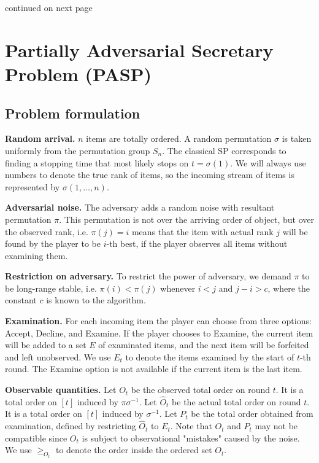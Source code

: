 
continued on next page

\newpage
\section{Partially Adversarial Secretary Problem (PASP)}

\subsection{Problem formulation }
\textbf{Random arrival.} $n $ items are totally ordered. A random permutation $\sigma $ is taken uniformly from the permutation group $S_n$. The classical SP corresponds to finding a stopping time that most likely stops on $t = \sigma(1)$. We will always use numbers to denote the true rank of items, so the incoming stream of items is represented by $\sigma(1,\ldots,n)$.

\textbf{Adversarial noise.} The adversary adds a random noise with resultant permutation $\pi $. This permutation is not over the arriving order of object, but over the observed rank, i.e. $\pi(j)=i $ means that the item with actual rank $j $ will be found by the player to be $i $-th best, if the player observes all items without examining them.

\textbf{Restriction on adversary.} To restrict the power of adversary, we demand $\pi$ to be long-range stable, i.e. $\pi(i)<\pi(j)$ whenever $i<j $ and $j-i>c $, where the constant $c $ is known to the algorithm.

\textbf{Examination.} For each incoming item the player can choose from three options: \textsf{Accept}, \textsf{Decline}, and \textsf{Examine}. If the player chooses to \textsf{Examine}, the current item will be added to a set $E $ of examinated items, and the next item will be forfeited and left unobserved. We use $E_t$ to denote the items examined by the start of $t $-th round. The \textsf{Examine} option is not available if the current item is the last item.

\textbf{Observable quantities.} 
Let $O_t$ be the observed total order on round $t $. It is a total order on $[t] $ induced by $\pi \sigma^{-1}$.
Let $\widehat{O}_t$ be the actual total order on round $t$. It is a total order on $[t] $ induced by $\sigma^{-1}$.
Let $P_t $ be the total order obtained from examination, defined by restricting $\widehat{O}_t $ to $E_t $. Note that $O_t$ and $P_t$ may not be compatible since $O_t$ is subject to observational "mistakes" caused by the noise.
We use $\ge_{O_{t}}$ to denote the order inside the ordered set $O_{t}$.

